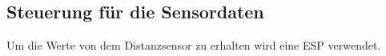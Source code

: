 \subsection{Steuerung für die Sensordaten}
\label{Distanzmessung:Steuerung}


Um die Werte von dem Distanzsensor zu erhalten wird eine ESP verwendet.






